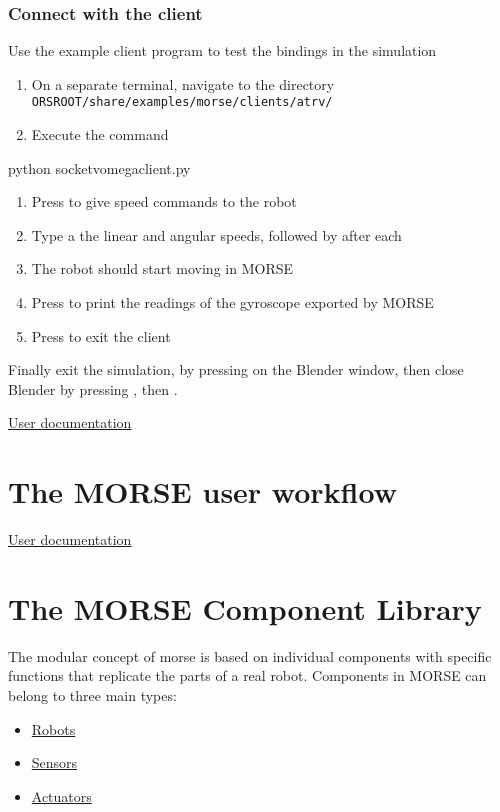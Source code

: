 \documentclass[twoside,a4paper,10pt]{report}
\newcommand{\dokutitlelevelone}[1]{\chapter{#1}}
\newcommand{\dokutitleleveltree}[1]{\subsection{#1}}
\newcommand{\dokumonospace}[1]{\texttt{#1}}
\newcommand{\dokuitem}{\item}
\newcommand{\dokuquoting}{\textbar}
\begin{document}
\dokutitleleveltree{Connect with the client}
\label{646d760bcdaf8445e5fb3dbad2c443e5}%
Use the example client program to test the bindings in the simulation



\begin{enumerate}\dokuitem  On a separate terminal, navigate to the directory \dokumonospace{{\textdollar}ORS{\textunderscore}ROOT/share/examples/morse/clients/atrv/}
\dokuitem  Execute the command
\end{enumerate}
    {\textdollar} python socket{\textunderscore}v{\textunderscore}omega{\textunderscore}client.py


\begin{enumerate}\dokuitem  Press  to give speed commands to the robot
\dokuitem  Type a the linear and angular speeds, followed by  after each
\dokuitem  The robot should start moving in MORSE
\dokuitem  Press  to print the readings of the gyroscope exported by MORSE
\dokuitem  Press  to exit the client
\end{enumerate}

Finally exit the simulation, by pressing  on the Blender window, then close Blender by pressing , then .

{\dokuquoting}{\dokuquoting} \hyperref[a80da1282f2c775bbc5f2c92c836968b]{ User documentation}


\dokutitlelevelone{The MORSE user workflow}
\label{2eb6dd59bcc0f89edd80bfe2fc4bec7f}%
\label{514bac84019bd5e09c0e2b525b09f429}%
{\dokuquoting}{\dokuquoting} \hyperref[a80da1282f2c775bbc5f2c92c836968b]{ User documentation}


\dokutitlelevelone{The MORSE Component Library}
\label{1d548ae3d571b50e147fca31be425d0f}%
\label{004fdec0cc1a00c19c57e892b7eb1400}%

The modular concept of morse is based on individual components with specific functions that replicate the parts of a real robot. Components in MORSE can belong to three main types:


\begin{itemize}
\dokuitem  \hyperref[d69ac14cd721dd995822d4e984f48116]{ Robots}
\dokuitem  \hyperref[029aee483db9ae244d7a5cb353e74602]{ Sensors}
\dokuitem  \hyperref[2068e59180763f350d66a42e828e7f96]{ Actuators}
\end{itemize}
\end{document}
